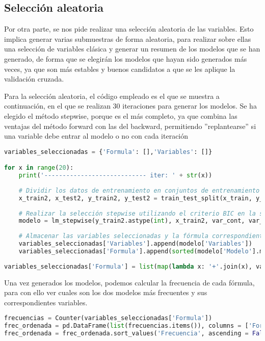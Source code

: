 \documentclass[a4paper,onecolumn]{extarticle}
\begin{document}
\begin{sloppypar}
\subsection{Selección aleatoria}\label{linaleatoria}
Por otra parte, se nos pide realizar una selección aleatoria de las variables. Esto implica generar varias submuestras de forma aleatoria, para realizar 
sobre ellas una selección de variables clásica y generar un resumen de los modelos que se han generado, de forma que se elegirán los modelos que hayan sido 
generados más veces, ya que son más estables y buenos candidatos a que se les aplique la validación cruzada.

Para la selección aleatoria, el código empleado es el que se muestra a continuación, en el que se realizan 30 iteraciones para generar los modelos. Se ha 
elegido el método stepwise, porque es el más completo, ya que combina las ventajas del método forward con las del backward, permitiendo ''replantearse'' si 
una variable debe entrar al modelo o no con cada iteración
\begin{lstlisting}[language=Python]
variables_seleccionadas = {'Formula': [],'Variables': []}

for x in range(20):
    print('---------------------------- iter: ' + str(x))
    
    # Dividir los datos de entrenamiento en conjuntos de entrenamiento y prueba.
    x_train2, x_test2, y_train2, y_test2 = train_test_split(x_train, y_train, test_size = 0.3, random_state = 29112002 + x)
    
    # Realizar la selección stepwise utilizando el criterio BIC en la submuestra.
    modelo = lm_stepwise(y_train2.astype(int), x_train2, var_cont, var_categ, interacciones_unicas, 'BIC')
    
    # Almacenar las variables seleccionadas y la fórmula correspondiente.
    variables_seleccionadas['Variables'].append(modelo['Variables'])
    variables_seleccionadas['Formula'].append(sorted(modelo['Modelo'].model.exog_names))
    
variables_seleccionadas['Formula'] = list(map(lambda x: '+'.join(x), variables_seleccionadas['Formula']))
\end{lstlisting}

Una vez generados los modelos, podemos calcular la frecuencia de cada fórmula, para con ello ver cuales son los dos modelos más frecuentes y sus 
correspondientes variables.

\begin{lstlisting}[language=Python]
frecuencias = Counter(variables_seleccionadas['Formula'])
frec_ordenada = pd.DataFrame(list(frecuencias.items()), columns = ['Formula', 'Frecuencia'])
frec_ordenada = frec_ordenada.sort_values('Frecuencia', ascending = False).reset_index()


\end{lstlisting}
\end{sloppypar}
\end{document}
